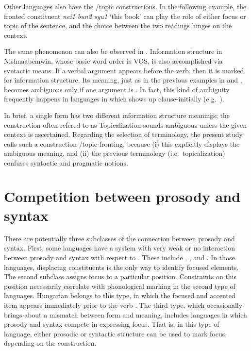 Other languages also have the /topic  constructions. In
the following  example, the fronted constituent \textit{nei1
  bun2 syu1} `this book' can play the role of either focus or topic of
the sentence, and the choice between the two readings hinges on the
context.





\noindent The same phenomenon can also be observed in
.  Information structure in Nishnaabemwin, whose
basic word order is VOS, is also accomplished via syntactic means.  If
a verbal argument appears before the verb, then it is marked for
information structure.  Its meaning, just as in the previous examples
in  and , becomes ambiguous only if one
argument is  \citep{valentine:01}.  In fact, this kind
of ambiguity frequently happens in languages in which 
shows up clause-initially (e.g.\ ).




In brief, a single form has two different information structure
meanings; the construction often refered to as Topicalization
\citep{prince:84} sounds ambiguous unless the given context is
ascertained.  Regarding the selection of terminology, the present
study calls such a construction /topic-fronting, because (i) this
explicitly displays the ambiguous meaning, and (ii) the previous
terminology (i.e.\ topicalization) confuses syntactic and pragmatic
notions.



\section{Competition between prosody and syntax}
\label{5:sec:competition}


There are potentially three subclasses of the connection between
prosody and syntax.  First, some languages have a system with very
weak or no interaction between prosody and syntax with respect to
. These include 
\citep{engdahl:vallduvi:96},  \citep{drubig:03}, and
 \citep{kugler:etal:07}. In those languages,
displacing constituents is the only way to identify focused
elements. The second subclass assigns focus to a particular
position. Constraints on this position necessarily correlate with
phonological marking in the second type of languages.  Hungarian
belongs to this type, in which the focused and accented item appears
immediately prior to the verb \citep{kiss:98,szendroi:01}. The third
type, which occasionally brings about a mismatch between form and
meaning, includes languages in which prosody and syntax compete in
expressing focus. That is, in this type of language,
either prosodic or syntactic structure can be used to mark focus,
depending on the construction.


